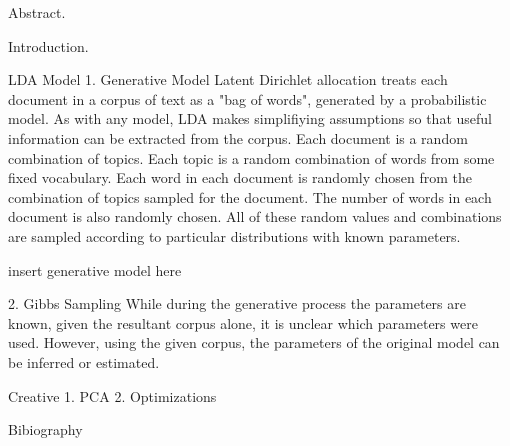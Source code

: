 

Abstract.

Introduction.



LDA Model
1. Generative Model
Latent Dirichlet allocation treats each document in a corpus of text as a "bag of words", generated
by a probabilistic model.
As with any model, LDA makes simplifiying assumptions so that useful information can be extracted
from the corpus.
Each document is a random combination of topics.
Each topic is a random combination of words from some fixed vocabulary.
Each word in each document is randomly chosen from the combination of topics sampled for the document.
The number of words in each document is also randomly chosen.
All of these random values and combinations are sampled according to particular distributions with
known parameters.

insert generative model here


2. Gibbs Sampling
While during the generative process the parameters are known, given the resultant corpus alone, it is unclear
which parameters were used.
However, using the given corpus, the parameters of the original model can be inferred or estimated.







Creative
1. PCA
2. Optimizations

Bibiography
